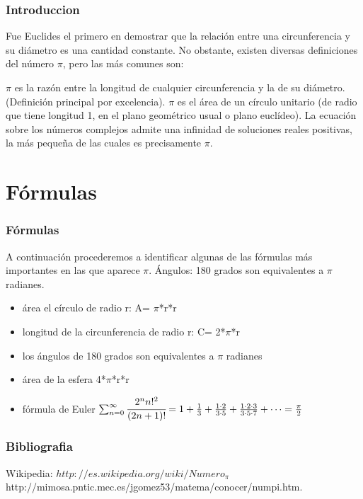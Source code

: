 \documentclass{beamer}
\begin{document}

\begin{frame}
\frametitle{Introduccion}

Fue Euclides el primero en demostrar que la relación entre una circunferencia y su diámetro es una cantidad constante. No obstante, existen diversas definiciones del número $\pi$, pero las más comunes son:

$\pi$ es la razón entre la longitud de cualquier circunferencia y la de su diámetro. (Definición principal por excelencia).
$\pi$ es el área de un círculo unitario (de radio que tiene longitud 1, en el plano geométrico usual o plano euclídeo).
La ecuación sobre los números complejos admite una infinidad de soluciones reales positivas, la más pequeña de las cuales es precisamente $\pi$.
\end{frame}



\section {Fórmulas}
\begin{frame}
\frametitle{Fórmulas}
\begin{block}
A continuación procederemos a identificar algunas de las fórmulas más importantes en las que aparece $\pi$.
%
%
%
Ángulos: 180 grados son equivalentes a $\pi$ radianes.
%
%
\begin{itemize}
\item área el círculo de radio r: A= $\pi$*r*r \pause
\item longitud de la circunferencia de radio r: C= 2*$\pi$*r \pause
\item los ángulos de 180 grados son equivalentes a $\pi$ radianes \pause
\item área de la esfera 4*$\pi$*r*r \pause
\item fórmula de Euler $\sum_{n=0}^{\infty }\cfrac{2^n n!^2}{(2n + 1)!}=1 + \frac{1}{3} + \frac{1 \cdot 2}{3 \cdot 5} + \frac{1 \cdot 2 \cdot 3}{3 \cdot 5 \cdot 7} + \cdots = \frac{\pi}{2}$
%
\end{itemize}
%
\end{block}
\end{frame}

\begin{frame}
\frametitle{Bibliografia}
\begin{thebibliography}{10}
\beamertemplatebookbibitems
{}
Wikipedia:
{\small $ http://es.wikipedia.org/wiki/Numero_\pi $}
http://mimosa.pntic.mec.es/jgomez53/matema/conocer/numpi.htm.
\end{thebibliography}
\end{frame}
\end{document}
